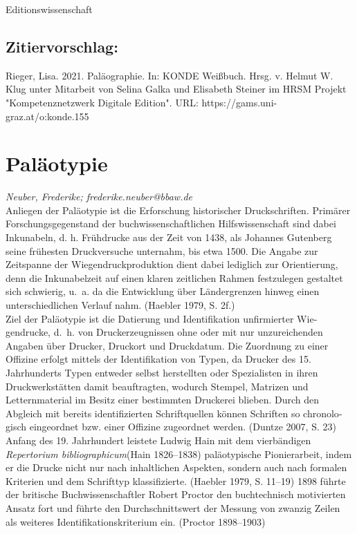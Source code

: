 \documentclass{article}
\begin{document}
Editionswissenschaft\subsection*{Zitiervorschlag:}Rieger, Lisa. 2021. Paläographie. In: KONDE Weißbuch. Hrsg. v. Helmut W. Klug unter Mitarbeit von Selina Galka und Elisabeth Steiner im HRSM Projekt "Kompetenznetzwerk Digitale Edition". URL: https://gams.uni-graz.at/o:konde.155\newpage\section*{Paläotypie} \emph{Neuber, Frederike; frederike.neuber@bbaw.de }\\
        
    Anliegen der Paläotypie ist die Erforschung historischer Druckschriften. Primärer Forschungsgegenstand der buchwissenschaftlichen Hilfswissenschaft sind dabei Inkunabeln, d. h. Frühdrucke aus der Zeit von 1438, als Johannes Gutenberg seine frühesten Druckversuche unternahm, bis etwa 1500. Die Angabe zur Zeitspanne der Wiegendruckproduktion dient dabei lediglich zur Orientierung, denn die Inkunabelzeit auf einen klaren zeitlichen Rahmen festzulegen gestaltet sich schwierig, u. a. da die Entwicklung über Län­dergrenzen hinweg einen unterschiedlichen Verlauf nahm. (Haebler 1979, S. 2f.)\\
            
        Ziel der Paläotypie ist die Datierung und Identifikation unfirmierter Wie­gendrucke, d. h. von Druckerzeugnissen ohne oder mit nur unzureichenden Angaben über Drucker, Druckort und Druckdatum. Die Zuordnung zu einer Offizine erfolgt mittels der Identifikation von Typen, da Drucker des 15. Jahrhunderts Typen ent­weder selbst herstellten oder Spezialisten in ihren Druckwerkstätten damit beauftragten, wodurch Stempel, Matrizen und Letternmaterial im Besitz einer be­stimmten Druckerei blieben. Durch den Abgleich mit bereits identifizierten Schriftquellen können Schriften so chronolo­gisch eingeordnet bzw. einer Offizine zugeordnet werden. (Duntze 2007, S. 23)\\
            
        Anfang des 19. Jahrhundert leistete Ludwig Hain mit dem vierbändigen \emph{Repertorium bibliogra­phicum}(Hain 1826–1838) paläotypische Pionierarbeit, indem er die Drucke nicht nur nach inhaltlichen Aspekten, sondern auch nach formalen Kriterien und dem Schrifttyp klassifizierte. (Haebler 1979, S. 11–19) 1898 führte der britische Buchwissenschaftler Robert Proctor den buchtech­nisch motivierten Ansatz fort und führte den Durchschnittswert der Messung von zwanzig Zeilen als weiteres Identifikationskriterium ein. (Proctor 1898–1903)\\
            
\end{document}
